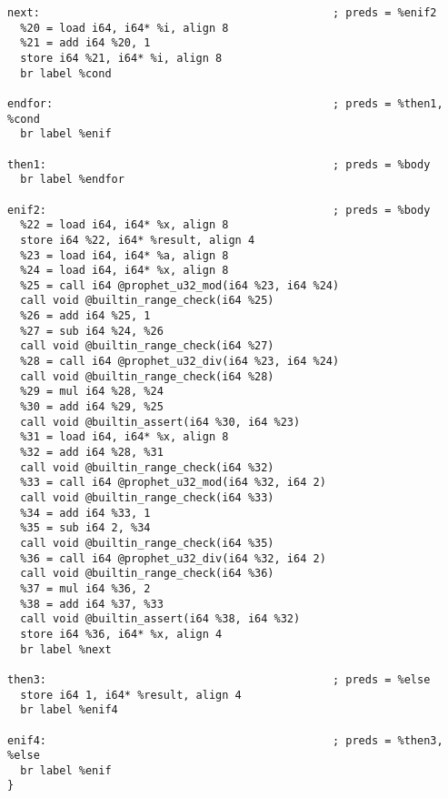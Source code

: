 \begin{lstlisting}
next:                                             ; preds = %enif2
  %20 = load i64, i64* %i, align 8
  %21 = add i64 %20, 1
  store i64 %21, i64* %i, align 8
  br label %cond

endfor:                                           ; preds = %then1, %cond
  br label %enif

then1:                                            ; preds = %body
  br label %endfor

enif2:                                            ; preds = %body
  %22 = load i64, i64* %x, align 8
  store i64 %22, i64* %result, align 4
  %23 = load i64, i64* %a, align 8
  %24 = load i64, i64* %x, align 8
  %25 = call i64 @prophet_u32_mod(i64 %23, i64 %24)
  call void @builtin_range_check(i64 %25)
  %26 = add i64 %25, 1
  %27 = sub i64 %24, %26
  call void @builtin_range_check(i64 %27)
  %28 = call i64 @prophet_u32_div(i64 %23, i64 %24)
  call void @builtin_range_check(i64 %28)
  %29 = mul i64 %28, %24
  %30 = add i64 %29, %25
  call void @builtin_assert(i64 %30, i64 %23)
  %31 = load i64, i64* %x, align 8
  %32 = add i64 %28, %31
  call void @builtin_range_check(i64 %32)
  %33 = call i64 @prophet_u32_mod(i64 %32, i64 2)
  call void @builtin_range_check(i64 %33)
  %34 = add i64 %33, 1
  %35 = sub i64 2, %34
  call void @builtin_range_check(i64 %35)
  %36 = call i64 @prophet_u32_div(i64 %32, i64 2)
  call void @builtin_range_check(i64 %36)
  %37 = mul i64 %36, 2
  %38 = add i64 %37, %33
  call void @builtin_assert(i64 %38, i64 %32)
  store i64 %36, i64* %x, align 4
  br label %next

then3:                                            ; preds = %else
  store i64 1, i64* %result, align 4
  br label %enif4

enif4:                                            ; preds = %then3, %else
  br label %enif
}
\end{lstlisting}

